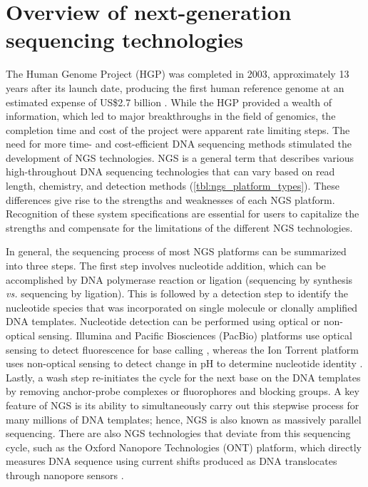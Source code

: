 \section{Overview of next-generation sequencing technologies}
\label{sec:Overviewofnext-generationsequencingtechnologies}

The Human Genome Project (\acs{HGP}) was completed in 2003, approximately 13 years after its launch date, producing the first human reference genome at an estimated expense of US\$2.7 billion \cite{NationalHumanGenomeResearchInstitute2010}. While the HGP provided a wealth of information, which led to major breakthroughs in the field of genomics, the completion time and cost of the project were apparent rate limiting steps. The need for more time- and cost-efficient DNA sequencing methods stimulated the development of NGS technologies. NGS is a general term that describes various high-throughout DNA sequencing technologies that can vary based on read length, chemistry, and detection methods (\autoref{tbl:ngs_platform_types}). These differences give rise to the strengths and weaknesses of each NGS platform. Recognition of these system specifications are essential for users to capitalize the strengths and compensate for the limitations of the different NGS technologies.

In general, the sequencing process of most NGS platforms can be summarized into three steps. The first step involves nucleotide addition, which can be accomplished by DNA polymerase reaction or ligation (sequencing by synthesis \textit{vs.} sequencing by ligation). This is followed by a detection step to identify the nucleotide species that was incorporated on single molecule or clonally amplified DNA templates. Nucleotide detection can be performed using optical or non-optical sensing. Illumina and Pacific Biosciences (PacBio) platforms use optical sensing to detect fluorescence for base calling \cite{Bentley2008, Guo2008, Carneiro2012, English2012, Eid2009}, whereas the Ion Torrent platform uses non-optical sensing to detect change in pH to determine nucleotide identity \cite{Rothberg2011}. Lastly, a wash step re-initiates the cycle for the next base on the DNA templates by removing anchor-probe complexes or fluorophores and blocking groups. A key feature of NGS is its ability to simultaneously carry out this stepwise process for many millions of DNA templates; hence, NGS is also known as massively parallel sequencing. There are also NGS technologies that deviate from this sequencing cycle, such as the Oxford Nanopore Technologies (ONT) platform, which directly measures DNA sequence using current shifts produced as DNA translocates through nanopore sensors \cite{Wang2014}.

